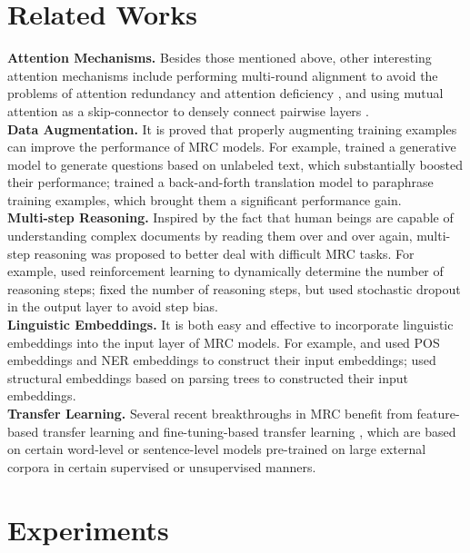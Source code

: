 \documentclass[11pt,a4paper]{article}
\begin{document}
\section{Related Works}
\textbf{Attention Mechanisms.} Besides those mentioned above, other interesting attention mechanisms include performing multi-round alignment to avoid the problems of attention redundancy and attention deficiency \cite{huminghao:2017}, and using mutual attention as a skip-connector to densely connect pairwise layers \cite{tayyi:2018}. \\
\textbf{Data Augmentation.} It is proved that properly augmenting training examples can improve the performance of MRC models. For example, \citet{yangzhilin:2017} trained a generative model to generate questions based on unlabeled text, which substantially boosted their performance; \citet{yuadamswei:2018} trained a back-and-forth translation model to paraphrase training examples, which brought them a significant performance gain. \\
\textbf{Multi-step Reasoning.} Inspired by the fact that human beings are capable of understanding complex documents by reading them over and over again, multi-step reasoning was proposed to better deal with difficult MRC tasks. For example, \citet{shenyelong:2017} used reinforcement learning to dynamically determine the number of reasoning steps; \citet{liuxiaodong:2017} fixed the number of reasoning steps, but used stochastic dropout in the output layer to avoid step bias. \\
\textbf{Linguistic Embeddings.} It is both easy and effective to incorporate linguistic embeddings into the input layer of MRC models. For example, \citet{chendanqi:2017} and \citet{liuxiaodong:2017} used POS embeddings and NER embeddings to construct their input embeddings; \citet{liurui:2017} used structural embeddings based on parsing trees to constructed their input embeddings. \\
\textbf{Transfer Learning.} Several recent breakthroughs in MRC benefit from feature-based transfer learning \cite{mccannbryan:2017,petersmatthewe:2018} and fine-tuning-based transfer learning \cite{radfordalec:2018,devlinjacob:2018}, which are based on certain word-level or sentence-level models pre-trained on large external corpora in certain supervised or unsupervised manners.

\section{Experiments}
\end{document}
